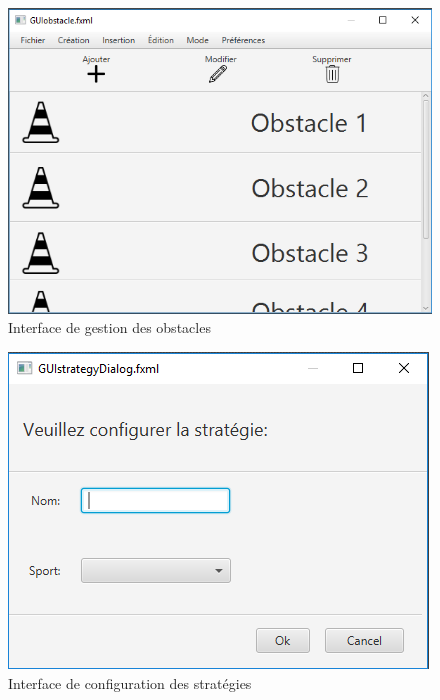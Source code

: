 \begin{figure}[htpb]
    \centering
    \includegraphics[scale=0.6]{fig/gui/gui_obstacles.png}
    \caption{Interface de gestion des obstacles}
    \label{fig:gui:gui_obstacles}
\end{figure}

\begin{figure}[htpb]
    \centering
    \includegraphics[scale=0.6]{fig/gui/gui_strategie_dialog.png}
    \caption{Interface de configuration des stratégies}
    \label{fig:gui:gui_strategie_dialog}
\end{figure}

